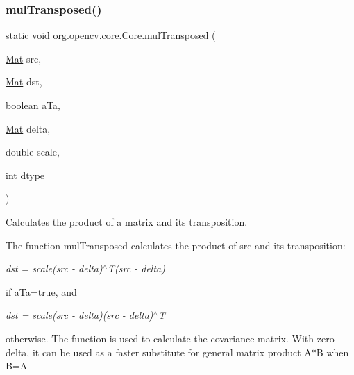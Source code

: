 \subsubsection{\texorpdfstring{mul\+Transposed()}{mulTransposed()}\hspace{0.1cm}{\footnotesize\ttfamily [1/3]}}
{\footnotesize\ttfamily static void org.\+opencv.\+core.\+Core.\+mul\+Transposed (\begin{DoxyParamCaption}\item[{\mbox{\hyperlink{classorg_1_1opencv_1_1core_1_1_mat}{Mat}}}]{src,  }\item[{\mbox{\hyperlink{classorg_1_1opencv_1_1core_1_1_mat}{Mat}}}]{dst,  }\item[{boolean}]{a\+Ta,  }\item[{\mbox{\hyperlink{classorg_1_1opencv_1_1core_1_1_mat}{Mat}}}]{delta,  }\item[{double}]{scale,  }\item[{int}]{dtype }\end{DoxyParamCaption})\hspace{0.3cm}{\ttfamily [static]}}

Calculates the product of a matrix and its transposition.

The function {\ttfamily mul\+Transposed} calculates the product of {\ttfamily src} and its transposition\+:

{\itshape dst = scale(src -\/ delta)$^\wedge$T(src -\/ delta)}

if {\ttfamily a\+Ta=true}, and

{\itshape dst = scale(src -\/ delta)(src -\/ delta)$^\wedge$T}

otherwise. The function is used to calculate the covariance matrix. With zero delta, it can be used as a faster substitute for general matrix product {\ttfamily A$\ast$B} when {\ttfamily B=A\textquotesingle{}}


